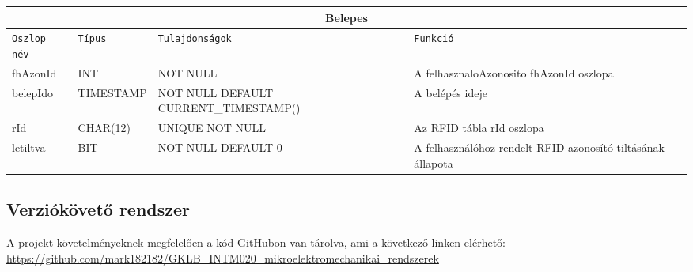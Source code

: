 \documentclass[11pt, a4paper]{article}
\begin{document}
				\begin{minipage}{\linewidth}
					\fontsize{10}{16}\selectfont
					\centering
					\begin{tabular}{||m{6em} m{6em} m{12.5em} m{12em}||}
						\hline
						\multicolumn{4}{|c|}{\textbf{Belepes}} \\
						\hline
						\texttt{Oszlop név} & \texttt{Típus} & \texttt{Tulajdonságok} & \texttt{Funkció} \\
						\hline\hline
						fhAzonId & INT & NOT NULL & A felhasznaloAzonosito fhAzonId oszlopa \\ 
						\hline
						belepIdo & TIMESTAMP & NOT NULL\newline{} DEFAULT CURRENT\_TIMESTAMP() & A belépés ideje \\ 
						\hline
						rId & CHAR(12) & UNIQUE NOT NULL & Az RFID tábla rId oszlopa \\ 
						\hline
						letiltva & BIT & NOT NULL DEFAULT 0 & A felhasználóhoz rendelt RFID azonosító tiltásának állapota \\
						\hline
					\end{tabular}
					\label{table:4}
				\end{minipage}
			
		\subsection{Verziókövető rendszer}
			\begin{flushleft}
				\justifying
				A projekt követelményeknek megfelelően a kód GitHubon van tárolva, ami a következő linken elérhető:
				 \color{blue}
				 \url{https://github.com/mark182182/GKLB_INTM020_mikroelektromechanikai_rendszerek}
			\end{flushleft}
			
\end{document}
